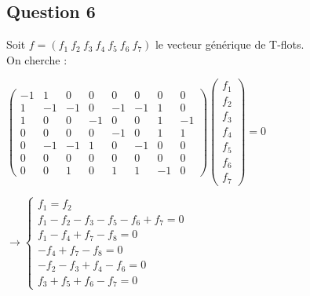 \subsection{Question 6}
Soit $f=(f_1\ f_2\ f_3\ f_4\ f_5\ f_6\ f_7)$ le vecteur générique de T-flots.\\
On cherche : 
\begin{center}

$\begin{pmatrix}
-1 & 1 & 0 & 0 & 0 & 0 & 0 & 0\\
 1 &-1 &-1 & 0 &-1 &-1 & 1 & 0\\
 1 & 0 & 0 &-1 & 0 & 0 & 1 &-1\\
 0 & 0 & 0 & 0 &-1 & 0 & 1 & 1\\
 0 &-1 &-1 & 1 & 0 &-1 & 0 & 0\\
 0 & 0 & 0 & 0 & 0 & 0 & 0 & 0\\
 0 & 0 & 1 & 0 & 1 & 1 &-1 & 0
\end{pmatrix}
\begin{pmatrix}
f_1\\
f_2\\ 
f_3\\ 
f_4\\ 
f_5\\ 
f_6\\ 
f_7
\end{pmatrix}
=0
$

\vspace{0.5cm}

$\rightarrow 
\begin{cases}
f_1 = f_2\\
f_1 - f_2 - f_3 - f_5 - f_6 + f_7 = 0\\
f_1 - f_4 + f_7 - f_8 = 0\\
-f_4 + f_7 - f_8 = 0\\
-f_2 - f_3 + f_4 - f_6 = 0\\
f_3 + f_5 + f_6 - f_7 = 0
\end{cases}$

\end{center}
